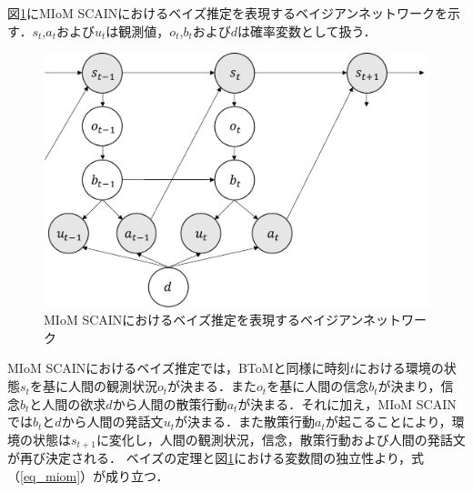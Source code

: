 \par
図\ref{fig:miom}にMIoM SCAINにおけるベイズ推定を表現するベイジアンネットワークを示す．$s_t$,$a_t$および$u_t$は観測値，$o_t$,$b_t$および$d$は確率変数として扱う．
\begin{figure}[htbp]
  \begin{center}
    \includegraphics[scale=0.7]{./miom.pdf}
    \caption{MIoM SCAINにおけるベイズ推定を表現するベイジアンネットワーク}
    \label{fig:miom}
  \end{center}
\end{figure}
MIoM SCAINにおけるベイズ推定では，BToMと同様に時刻$t$における環境の状態$s_{t}$を基に人間の観測状況$o_{t}$が決まる．また$o_{t}$を基に人間の信念$b_{t}$が決まり，信念$b_{t}$と人間の欲求$d$から人間の散策行動$a_{t}$が決まる．それに加え，MIoM SCAINでは$b_t$と$d$から人間の発話文$u_t$が決まる．また散策行動$a_{t}$が起こることにより，環境の状態は$s_{t+1}$に変化し，人間の観測状況，信念，散策行動および人間の発話文が再び決定される．
ベイズの定理と図\ref{fig:miom}における変数間の独立性より，式（\ref{eq_miom}）が成り立つ．

